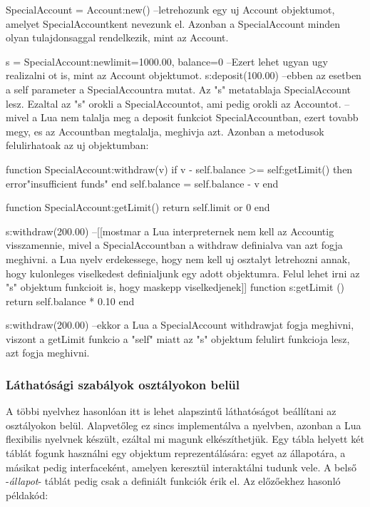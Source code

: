 \begin{lua}
SpecialAccount = Account:new() --letrehozunk egy uj Account objektumot, amelyet SpecialAccountkent nevezunk el. Azonban a SpecialAccount minden olyan tulajdonsaggal rendelkezik, mint az Account.

s = SpecialAccount:new{limit=1000.00, balance=0} --Ezert lehet ugyan ugy realizalni ot is, mint az Account objektumot.
s:deposit(100.00) --ebben az esetben a self parameter a SpecialAccountra mutat. Az "s" metatablaja SpecialAccount lesz. Ezaltal az "s" orokli a SpecialAccountot, ami pedig orokli az Accountot.
--mivel a Lua nem talalja meg a deposit funkciot SpecialAccountban, ezert tovabb megy, es az Accountban megtalalja, meghivja azt. Azonban a metodusok felulirhatoak az uj objektumban:

function SpecialAccount:withdraw(v)
	if v - self.balance >= self:getLimit() then
		error"insufficient funds"
	end
	self.balance = self.balance - v
end

function SpecialAccount:getLimit()
	return self.limit or 0
end

s:withdraw(200.00) --[[mostmar a Lua interpreternek nem kell az Accountig visszamennie, mivel a SpecialAccountban a withdraw definialva van azt fogja meghivni. 
a Lua nyelv erdekessege, hogy nem kell uj osztalyt letrehozni annak, hogy kulonleges viselkedest definialjunk egy adott objektumra. Felul lehet irni az "s" objektum funkcioit is, hogy maskepp viselkedjenek]]
function s:getLimit ()
  return self.balance * 0.10
end

s:withdraw(200.00) --ekkor a Lua a SpecialAccount withdrawjat fogja meghivni, viszont a getLimit funkcio a "self" miatt az "s" objektum felulirt funkcioja lesz, azt fogja meghivni.
\end{lua}
\pagebreak
\subsubsection{Láthatósági szabályok osztályokon belül}
A többi nyelvhez hasonlóan itt is lehet alapszintű láthatóságot beállítani az osztályokon belül. Alapvetőleg ez sincs implementálva a nyelvben, azonban a Lua flexibilis nyelvnek készült, ezáltal mi magunk elkészíthetjük. Egy tábla helyett két táblát fogunk használni egy objektum reprezentálására:
egyet az állapotára, a másikat pedig interfaceként, amelyen keresztül interaktálni tudunk vele. A belső -\textit{állapot}- táblát pedig csak a definiált funkciók érik el. Az előzőekhez hasonló példakód:

